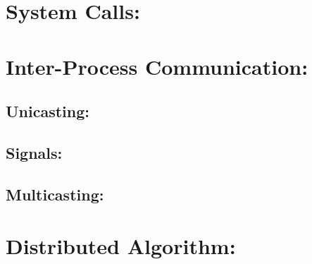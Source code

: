 \documentclass[a4 paper]{article}
\begin{document}


\section{System Calls:}

\section{Inter-Process Communication:}
\subsection*{Unicasting:}
\subsection*{Signals:}
\subsection*{Multicasting:}

\section{Distributed Algorithm:}

\raggedbottom
\end{document}
